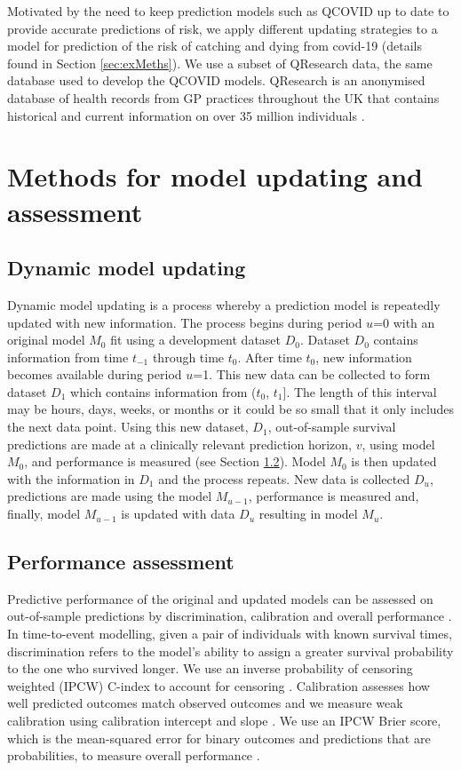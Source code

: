 \documentclass[]{article}
\begin{document}
Motivated by the need to keep prediction models such as QCOVID up to date to provide accurate predictions of risk, we apply different updating strategies to a model for prediction of the risk of catching and dying from covid-19 (details found in Section \ref{sec:exMeths}). We use a subset of QResearch data, the same database used to develop the QCOVID models. QResearch is an anonymised database of health records from GP practices throughout the UK that contains historical and current information on over 35 million individuals \citep{QResearch2022}.  


\section{Methods for model updating and assessment}

\subsection{Dynamic model updating}
Dynamic model updating is a process whereby a prediction model is repeatedly updated with new information. The process begins during period $u$=0 with an original model $M_0$ fit using a development dataset $D_0$. Dataset $D_0$ contains information from time $t_{-1}$ through time $t_0$. After time $t_0$, new information becomes available during period $u$=1. This new data can be collected to form dataset $D_1$ which contains information from ($t_0$, $t_1$]. The length of this interval may be hours, days, weeks, or months or it could be so small that it only includes the next data point. Using this new dataset, $D_1$, out-of-sample survival predictions are made at a clinically relevant prediction horizon, $v$, using model $M_0$, and performance is measured (see Section \ref{sec:ModAssess}). Model $M_0$ is then updated with the information in $D_1$ and the process repeats.  New data is collected $D_u$, predictions are made using the model $M_{u-1}$, performance is measured and, finally, model $M_{u-1}$ is updated with data $D_u$ resulting in model $M_u$.    


\subsection{Performance assessment}
\label{sec:ModAssess}

Predictive performance of the original and updated models can be assessed on out-of-sample predictions by discrimination, calibration and overall performance \citep{Steyerberg2009, McLernon2023}. In time-to-event modelling, given a pair of individuals with known survival times, discrimination refers to the model's ability to assign a greater survival probability to the one who survived longer. We use an inverse probability of censoring weighted (IPCW) C-index to account for censoring \citep{Gerds2013}. Calibration assesses how well predicted outcomes match observed outcomes and we measure weak calibration using calibration intercept and slope \citep{Royston2013, Crowson2016, VanCalster2019}. We use an IPCW Brier score, which is the mean-squared error for binary outcomes and predictions that are probabilities, to measure overall performance \citep{Graf1999}. 
\end{document}
